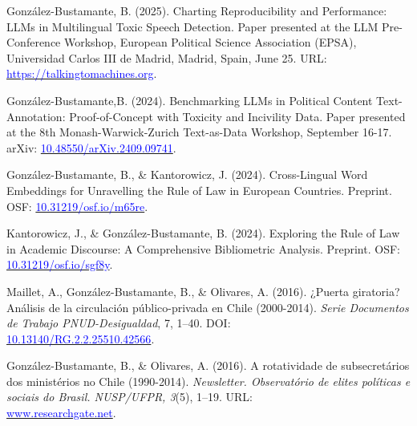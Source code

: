 \begin{publications}

\begin{benumerate}{8}

\item{González-Bustamante, B. (2025). Charting Reproducibility and Performance: LLMs in Multilingual Toxic Speech Detection. Paper presented at the LLM Pre-Conference Workshop, European Political Science Association (EPSA), Universidad Carlos III de Madrid, Madrid, Spain, June 25. URL: \href{https://talkingtomachines.org/large-language-models-workshop/}{\textcolor{blue}{https://talkingtomachines.org}}.}\vspace{1mm}

\item{González-Bustamante,B. (2024). Benchmarking LLMs in Political Content Text-Annotation: Proof-of-Concept with Toxicity and Incivility Data. Paper presented at the 8th Monash-Warwick-Zurich Text-as-Data Workshop, September 16-17. arXiv: \href{https://doi.org/10.48550/arXiv.2409.09741}{\textcolor{blue}{10.48550/arXiv.2409.09741}}.}\vspace{1mm}

\item{González-Bustamante, B., \& Kantorowicz, J. (2024). Cross-Lingual Word Embeddings for Unravelling the Rule of Law in European Countries. Preprint. OSF: \href{https://doi.org/10.31219/osf.io/m65re}{\textcolor{blue}{10.31219/osf.io/m65re}}.}\vspace{1mm}

\item{Kantorowicz, J., \& González-Bustamante, B. (2024). Exploring the Rule of Law in Academic Discourse: A Comprehensive Bibliometric Analysis. Preprint. OSF: \href{https://doi.org/10.31219/osf.io/sgf8y}{\textcolor{blue}{10.31219/osf.io/sgf8y}}.}\vspace{1mm}

\item{Maillet, A., González-Bustamante, B., \& Olivares, A. (2016). ¿Puerta giratoria? Análisis de la circulación público-privada en Chile (2000-2014). {\itshape Serie Documentos de Trabajo PNUD-Desigualdad}, 7, 1--40. DOI: \\ \href{http://doi.org/10.13140/RG.2.2.25510.42566}{\textcolor{blue}{10.13140/RG.2.2.25510.42566}}.}\vspace{1mm}

\item{González-Bustamante, B., \& Olivares, A. (2016). A rotatividade de subsecretários dos ministérios no Chile (1990-2014). {\itshape Newsletter. Observat\'orio de elites pol\'iticas e sociais do Brasil. NUSP/UFPR, 3}(5), 1--19. URL: \\ \href{https://www.researchgate.net/publication/321993740_A_rotatividade_de_subsecretarios_dos_ministerios_no_Chile_1990-2014}{\textcolor{blue}{www.researchgate.net}}.}\vspace{1mm}


\end{benumerate}
\end{publications}
